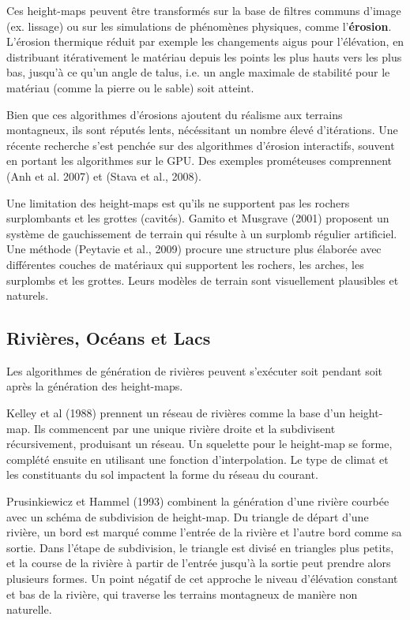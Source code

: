 \documentclass[11pt]{article}
\begin{document}
Ces height-maps peuvent être transformés sur la base de filtres communs d'image (ex. lissage) ou sur les simulations de phénomènes physiques, comme l'\textbf{érosion}. L'érosion thermique réduit par exemple les changements aigus pour l'élévation, en distribuant itérativement le matériau depuis les points les plus hauts vers les plus bas, jusqu'à ce qu'un angle de talus, i.e. un angle maximale de stabilité pour le matériau (comme la pierre ou le sable) soit atteint.\newline

Bien que ces algorithmes d'érosions ajoutent du réalisme aux terrains montagneux, ils sont réputés lents, nécéssitant un nombre élevé d'itérations. Une récente recherche s'est penchée sur des algorithmes d'érosion interactifs, souvent en portant les algorithmes sur le GPU. Des exemples prométeuses comprennent (Anh et al. 2007) et (Stava et al., 2008). \newline

Une limitation des height-maps est qu'ils ne supportent pas les rochers surplombants et les grottes (cavités). Gamito et Musgrave (2001) proposent un système de gauchissement de terrain qui résulte à un surplomb régulier artificiel. Une méthode (Peytavie et al., 2009) procure une structure plus élaborée avec différentes couches de matériaux qui supportent les rochers, les arches, les surplombs et les grottes. Leurs modèles de terrain sont visuellement plausibles et naturels.\newline


\subsection*{Rivières, Océans et Lacs}

Les algorithmes de génération de rivières peuvent s'exécuter soit pendant soit après la génération des height-maps. 

Kelley et al (1988) prennent un réseau de rivières comme la base d'un height-map. Ils commencent par une unique rivière droite et la subdivisent récursivement, produisant un réseau. Un squelette pour le height-map se forme, complété ensuite en utilisant une fonction d'interpolation. Le type de climat et les constituants du sol impactent la forme du réseau du courant. \newline

Prusinkiewicz et Hammel (1993) combinent la génération d'une rivière courbée avec un schéma de subdivision de height-map. Du triangle de départ d'une rivière, un bord est marqué comme l'entrée de la rivière et l'autre bord comme sa sortie. Dans l'étape de subdivision, le triangle est divisé en triangles plus petits, et la course de la rivière à partir de l'entrée jusqu'à la sortie peut prendre alors plusieurs formes. Un point négatif de cet approche le niveau d'élévation constant et bas de la rivière, qui traverse les terrains montagneux de manière non naturelle. \newline
\end{document}
